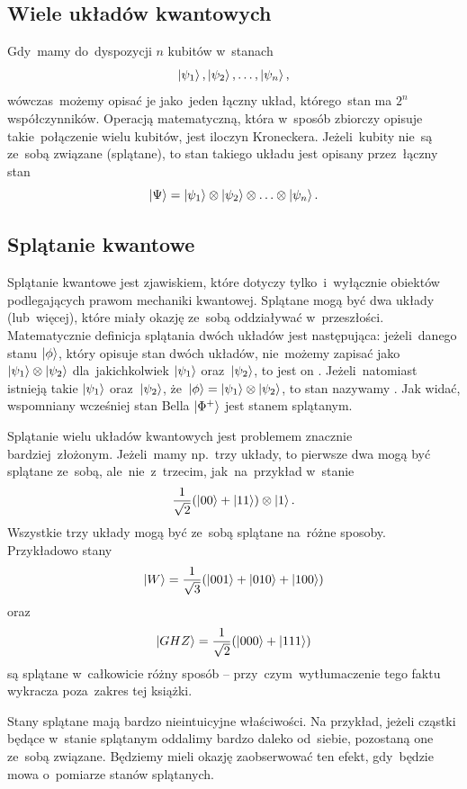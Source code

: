 \subsection{Wiele układów kwantowych}
Gdy~mamy do~dyspozycji $n$ kubitów w~stanach
$$\ket{\psi_1}, \ket{\psi_2}, \ldots, \ket{\psi_n},$$
wówczas~możemy opisać je jako~jeden łączny układ, którego~stan ma
$2^n$ współczynników. Operacją matematyczną,
która w~sposób zbiorczy opisuje takie~połączenie wielu kubitów, jest
iloczyn Kroneckera. Jeżeli~kubity nie~są ze~sobą związane (splątane), to stan
takiego układu jest opisany przez~łączny stan
$$
	\ket{\Psi}=\ket{\psi_1}\otimes \ket{\psi_2}\otimes \ldots\otimes \ket{\psi_n}.
$$

\subsection{Splątanie kwantowe}
Splątanie kwantowe jest zjawiskiem, które dotyczy tylko~i~wyłącznie obiektów
podlegających prawom mechaniki kwantowej. Splątane mogą być dwa układy (lub~więcej), które miały okazję ze~sobą
oddziaływać w~przeszłości. Matematycznie definicja
splątania dwóch układów jest następująca: jeżeli~danego stanu $\ket{\phi}$,
który opisuje stan dwóch układów, nie~możemy
zapisać jako~$\ket{\psi_1}\otimes\ket{\psi_2}$ dla~jakichkolwiek $\ket{\psi_1}$
oraz~$\ket{\psi_2}$, to jest on . Jeżeli~natomiast
istnieją takie $\ket{\psi_1}$ oraz~$\ket{\psi_2}$, że~$\ket{\phi}=\ket{\psi_1} \otimes \ket{\psi_2}$, to stan nazywamy
.
Jak widać, wspomniany wcześniej stan Bella $\ket{\Phi^+}$ jest stanem
splątanym.

Splątanie wielu układów kwantowych jest problemem znacznie bardziej~złożonym. Jeżeli~mamy
np.~trzy układy, to pierwsze dwa mogą być splątane ze~sobą, ale~nie~z~trzecim,
jak~na~przykład w~stanie
$$
	\frac{1}{\sqrt{2}}(\ket{00}+\ket{11})\otimes \ket{1}.
$$
Wszystkie trzy układy mogą być ze~sobą splątane na~różne sposoby. Przykładowo stany
$$
	\ket{W}=\frac{1}{\sqrt{3}}(\ket{001}+\ket{010}+\ket{100})
$$
oraz
$$
	\ket{GHZ}=\frac{1}{\sqrt{2}}(\ket{000}+\ket{111})
$$
są splątane w~całkowicie różny sposób -- przy~czym~wytłumaczenie tego faktu wykracza poza~zakres tej książki.

Stany splątane mają bardzo nieintuicyjne właściwości. Na przykład,
jeżeli cząstki będące w~stanie splątanym oddalimy bardzo daleko
od~siebie, pozostaną one ze~sobą związane. Będziemy mieli okazję
zaobserwować ten efekt, gdy~będzie mowa o~pomiarze stanów splątanych.

